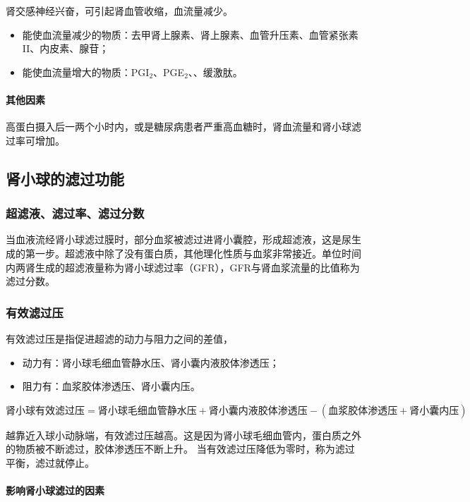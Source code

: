 肾交感神经兴奋，可引起肾血管收缩，血流量减少。
\begin{itemize}
	\item 能使血流量减少的物质：去甲肾上腺素、肾上腺素、血管升压素、血管紧张素II、内皮素、腺苷；
	\item 能使血流量增大的物质：PGI$_2$、PGE$_2$、、缓激肽。
\end{itemize}

\paragraph{其他因素}

高蛋白摄入后一两个小时内，或是糖尿病患者严重高血糖时，肾血流量和肾小球滤过率可增加。

\subsection{肾小球的滤过功能}

\subsubsection{超滤液、滤过率、滤过分数}
当血液流经肾小球滤过膜时，部分血浆被滤过进肾小囊腔，形成超滤液，这是尿生成的第一步。超滤液中除了没有蛋白质，其他理化性质与血浆非常接近。单位时间内两肾生成的超滤液量称为肾小球滤过率（GFR），GFR与肾血浆流量的比值称为滤过分数。

\subsubsection{有效滤过压}

有效滤过压是指促进超滤的动力与阻力之间的差值，
\begin{itemize}
	\item 动力有：肾小球毛细血管静水压、肾小囊内液胶体渗透压；
	\item 阻力有：血浆胶体渗透压、肾小囊内压。
\end{itemize}

$\text{肾小球有效滤过压}=\text{肾小球毛细血管静水压}+\text{肾小囊内液胶体渗透压}-(\text{血浆胶体渗透压}+\text{肾小囊内压})$

越靠近入球小动脉端，有效滤过压越高。这是因为肾小球毛细血管内，蛋白质之外的物质被不断滤过，胶体渗透压不断上升。
当有效滤过压降低为零时，称为滤过平衡，滤过就停止。

\paragraph{影响肾小球滤过的因素}

